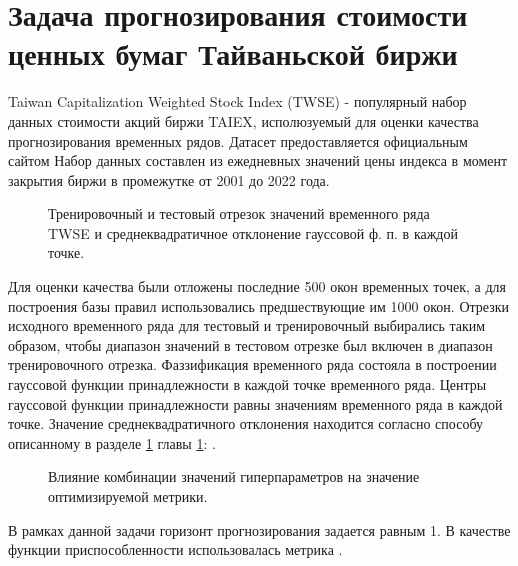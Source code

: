 \section{Задача прогнозирования стоимости ценных бумаг Тайваньской биржи}

\cite{Sadaei2016}

Taiwan Capitalization Weighted Stock Index (TWSE) - популярный набор данных стоимости акций биржи TAIEX, исполюзуемый для оценки качества прогнозирования временных рядов. Датасет предоставляется официальным сайтом  Набор данных составлен из ежедневных значений цены индекса в момент закрытия биржи в промежутке от 2001 до 2022 года.

\begin{figure}[hbt] 	
	\label{fig:twse-ns-fuzzification}
	\centering
	\caption{Тренировочный и тестовый отрезок значений временного ряда TWSE и среднеквадратичное отклонение гауссовой ф. п. в каждой точке.}
\end{figure}

 Для оценки качества были отложены последние 500 окон временных точек, а для построения базы правил использовались предшествующие им 1000 окон. Отрезки исходного временного ряда для тестовый и тренировочный выбирались таким образом, чтобы диапазон значений в тестовом отрезке был включен в диапазон тренировочного отрезка. Фаззификация временного ряда состояла в построении гауссовой функции принадлежности в каждой точке временного ряда. Центры гауссовой функции принадлежности равны значениям временного ряда в каждой точке. Значение среднеквадратичного отклонения находится согласно способу описанному в разделе \ref{} главы \ref{}: .
 
 \begin{figure}[hbt] 	
 	\label{fig:twse-optuna-parallel-score}
 	\centering
 	\caption{Влияние комбинации значений гиперпараметров на значение оптимизируемой метрики.}
 \end{figure}
 
В рамках данной задачи горизонт прогнозирования задается равным 1. В качестве функции приспособленности использовалась метрика .

